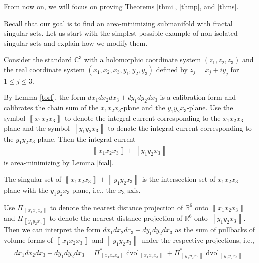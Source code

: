 \documentclass[11pt,a4paper]{amsart}
\numberwithin{equation}{section}
\newcommand{\ta}{\theta}
\newcommand{\cu}[1]{\left\llbracket#1\right\rrbracket}
\newcommand{\dvol}{\operatorname{dvol}}
\newcommand{\du}{^\ast}
\newcommand{\R}{\mathbb{R}}
\newcommand{\C}{\mathbb{C}}
\theoremstyle{plain}
\theoremstyle{definition}
\numberwithin{equation}{subsection}
\begin{document}
	From now on, we will focus on proving Theorems \ref{thmi}, \ref{thmp}, and \ref{thms}.
	
	Recall that our goal is to find an area-minimizing submanifold with fractal singular sets. Let us start with the simplest possible example of non-isolated singular sets and explain how we modify them.

Consider the standard $\C^3$ with a holomorphic coordinate system $(z_1,z_2,z_3)$ and the real coordinate system $(x_1,x_2,x_3,y_1,y_2,y_3)$ defined by $z_j=x_j+iy_j$ for $1\le j\le 3.$

By Lemma \ref{torf}, the form $dx_1dx_2dx_3+dy_1dy_2dx_3$ is a calibration form and calibrates the chain sum of the $x_1x_2x_3$-plane and the $y_1y_2x_3$-plane. Use the symbol $\cu{x_1x_2x_3}$ to denote the integral current corresponding to the $x_1x_2x_3$-plane and the symbol $\cu{y_1y_2x_3}$ to denote the integral current corresponding to the $y_1y_2x_3$-plane. Then the integral current
\begin{align*}
\cu{x_1x_2x_3}+\cu{y_1y_2x_3}
\end{align*} is area-minimizing by Lemma \ref{fcal}.%

 The singular set of $\cu{x_1x_2x_3}+\cu{y_1y_2x_3}$ is the intersection set of $x_1x_2x_3$-plane with the $y_1y_2x_3$-plane, i.e., the $x_3$-axis. 


Use $\Pi_{\cu{x_1x_2x_3}}$ to denote the nearest distance projection of $\R^6$ onto $\cu{x_1x_2x_3}$ and $\Pi_{\cu{y_1y_2x_3}}$ to denote the nearest distance projection of $\R^6$ onto $\cu{y_1y_2x_3}.$ Then we can interpret the form $dx_1dx_2dx_3+dy_1dy_2dx_3$ as the sum of pullbacks of volume forms of $\cu{x_1x_2x_3}$ and $\cu{y_1y_2x_3}$ under the respective projections, i.e.,
\begin{align*}
dx_1dx_2dx_3+dy_1dy_2dx_3=\Pi_{\cu{x_1x_2x_3}}\du \dvol_{\cu{x_1x_2x_3}}+\Pi_{\cu{y_1y_2x_3}}\du \dvol_{\cu{y_1y_2x_3}}\end{align*}
\end{document}
